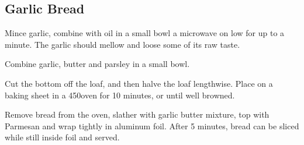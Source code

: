 \begin{recipe}
\subsection{Garlic Bread}



Mince garlic, combine with oil in a small bowl a microwave on low for up to a minute. The garlic should mellow and loose some of its raw taste.


Combine garlic, butter and parsley in a small bowl.


Cut the bottom off the loaf, and then halve the loaf lengthwise. Place on a baking sheet in a 450\degree oven for 10 minutes, or until well browned.


Remove bread from the oven, slather with garlic butter mixture, top with Parmesan and wrap tightly in aluminum foil.
After 5 minutes, bread can be sliced while still inside foil and served.

\end{recipe}
